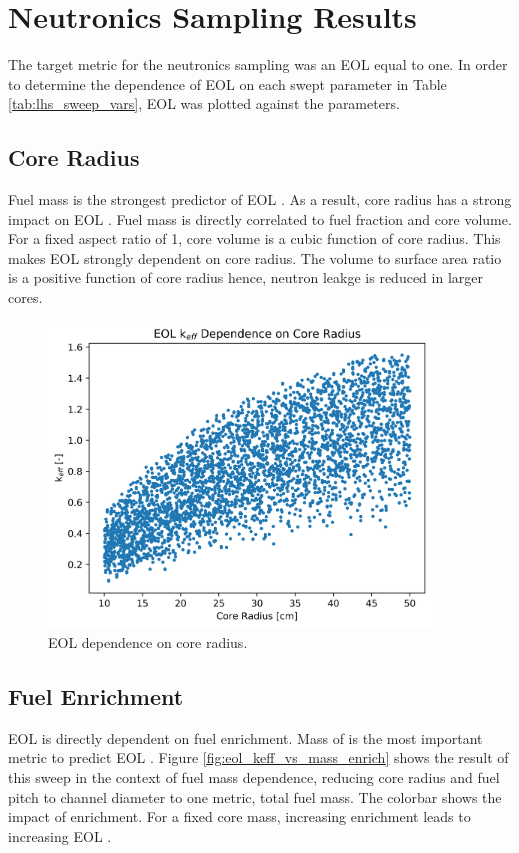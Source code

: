 \section{Neutronics Sampling Results}
The target metric for the neutronics sampling was an EOL \keff equal to one. In
order to determine the dependence of EOL \keff on each swept parameter in Table
\ref{tab:lhs_sweep_vars}, EOL \keff was plotted against the parameters.

\subsection{Core Radius}
Fuel mass is the strongest predictor of EOL \keff. As a result, core radius has a strong impact on EOL \keff. Fuel mass is directly correlated
to fuel fraction and core volume. For a fixed aspect ratio of 1, core volume is
a cubic function of core radius. This makes EOL \keff strongly dependent on core
radius. The volume to surface area ratio is a positive function of core radius
hence, neutron leakge is reduced in larger cores. 

\begin{figure}[h]
    \centering
    \includegraphics[width=4in]{../images/keff_vs_core_r.png}
\caption{EOL \keff dependence on core radius.}
\label{fig:eol_keff_vs_r_core}
\end{figure}

\subsection{Fuel Enrichment}
EOL \keff is directly dependent on fuel enrichment. Mass of \uran is the most
important metric to predict EOL \keff. Figure
\ref{fig:eol_keff_vs_mass_enrich} shows the result of this sweep in the context of
fuel mass dependence, reducing core radius and fuel pitch to channel diameter to
one metric, total fuel mass. The colorbar shows the impact of enrichment. For a fixed core
mass, increasing enrichment leads to increasing EOL \keff. 

